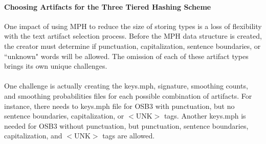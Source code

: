 		\paragraph{Choosing Artifacts for the Three Tiered Hashing Scheme} One impact of using MPH to reduce the size of storing types is a loss of flexibility with the text artifact selection process.  Before the MPH data structure is created, the creator must determine if punctuation, capitalization, sentence boundaries, or ``unknown" words will be allowed.  The omission of each of these artifact types brings its own unique challenges. 
		\paragraph*{} One challenge is actually creating the keys.mph, signature, smoothing counts, and smoothing probabilities files for each possible combination of artifacts.  For instance, there needs to keys.mph file for OSB3 with punctuation, but no sentence boundaries, capitalization, or $<\text{UNK}>$ tags.  Another keys.mph is needed for OSB3 without punctuation, but punctuation, sentence boundaries, capitalization, and $<\text{UNK}>$ tags are allowed.

